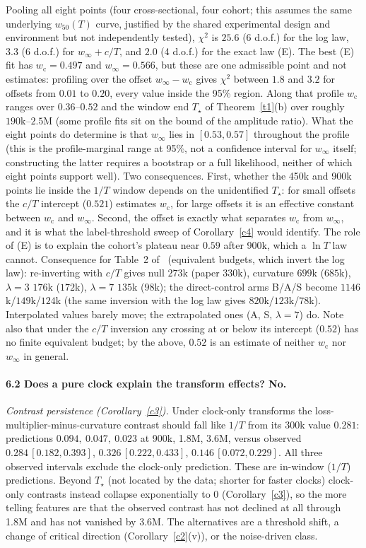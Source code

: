 \documentclass[11pt]{article}
\theoremstyle{definition}
\theoremstyle{remark}
\newcommand{\wcrit}{w_{\mathrm c}}
\newcommand{\wfifty}{w_{50}}
\newcommand{\Tstar}{T_\star}
\begin{document}
Pooling all eight points (four cross-sectional, four cohort; this assumes the same underlying $\wfifty(T)$ curve, justified by the shared experimental design and environment but not independently tested), $\chi^2$ is $25.6$ (6 d.o.f.) for the log law, $3.3$ (6 d.o.f.) for $w_\infty+c/T$, and $2.0$ (4 d.o.f.) for the exact law (E). The best (E) fit has $\wcrit=0.497$ and $w_\infty=0.566$, but these are one admissible point and not estimates: profiling over the offset $w_\infty-\wcrit$ gives $\chi^2$ between $1.8$ and $3.2$ for offsets from $0.01$ to $0.20$, every value inside the 95\% region. Along that profile $\wcrit$ ranges over $0.36$--$0.52$ and the window end $\Tstar$ of Theorem~\ref{t1}(b) over roughly $190$k--$2.5$M (some profile fits sit on the bound of the amplitude ratio). What the eight points do determine is that $w_\infty$ lies in $[0.53,0.57]$ throughout the profile (this is the profile-marginal range at 95\%, not a confidence interval for $w_\infty$ itself; constructing the latter requires a bootstrap or a full likelihood, neither of which eight points support well). Two consequences. First, whether the 450k and 900k points lie inside the $1/T$ window depends on the unidentified $\Tstar$: for small offsets the $c/T$ intercept ($0.521$) estimates $\wcrit$, for large offsets it is an effective constant between $\wcrit$ and $w_\infty$. Second, the offset is exactly what separates $\wcrit$ from $w_\infty$, and it is what the label-threshold sweep of Corollary~\ref{c4} would identify. The role of (E) is to explain the cohort's plateau near $0.59$ after 900k, which a $\ln T$ law cannot. Consequence for Table~2 of~\cite{P} (equivalent budgets, which invert the log law): re-inverting with $c/T$ gives null $273$k (paper $330$k), curvature $699$k ($685$k), $\lambda=3$ $176$k ($172$k), $\lambda=7$ $135$k ($98$k); the direct-control arms B/A/S become $1146$k/$149$k/$124$k (the same inversion with the log law gives $820$k/$123$k/$78$k). Interpolated values barely move; the extrapolated ones (A, S, $\lambda=7$) do. Note also that under the $c/T$ inversion any crossing at or below its intercept ($0.52$) has no finite equivalent budget; by the above, $0.52$ is an estimate of neither $\wcrit$ nor $w_\infty$ in general.

\paragraph{6.2 Does a pure clock explain the transform effects? No.}
\emph{Contrast persistence (Corollary~\ref{c3}).} Under clock-only transforms the loss-multiplier-minus-curvature contrast should fall like $1/T$ from its 300k value $0.281$: predictions $0.094,\ 0.047,\ 0.023$ at 900k, 1.8M, 3.6M, versus observed $0.284\,[0.182,0.393]$, $0.326\,[0.222,0.433]$, $0.146\,[0.072,0.229]$. All three observed intervals exclude the clock-only prediction. These are in-window ($1/T$) predictions. Beyond $\Tstar$ (not located by the data; shorter for faster clocks) clock-only contrasts instead collapse exponentially to $0$ (Corollary~\ref{c3}), so the more telling features are that the observed contrast has not declined at all through 1.8M and has not vanished by 3.6M. The alternatives are a threshold shift, a change of critical direction (Corollary~\ref{c2}(v)), or the noise-driven class.
\end{document}
